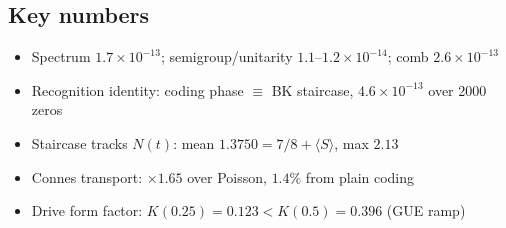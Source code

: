 \documentclass[11pt,a4paper]{article}
\begin{document}
\subsection{Key numbers}
\begin{tcolorbox}[colback=labblue!6, colframe=labblue!70!black, boxrule=0.6pt, title={Key results (canonical run)}]
\begin{itemize}[leftmargin=1.2em, itemsep=0.15em]
\item Spectrum $1.7\times10^{-13}$; semigroup/unitarity $1.1$--$1.2\times10^{-14}$; comb $2.6\times10^{-13}$
\item Recognition identity: coding phase $\equiv$ BK staircase, $4.6\times10^{-13}$ over 2000 zeros
\item Staircase tracks $N(t)$: mean $1.3750 = 7/8 + \langle S\rangle$, max $2.13$
\item Connes transport: $\times1.65$ over Poisson, $1.4\%$ from plain coding
\item Drive form factor: $K(0.25) = 0.123 < K(0.5) = 0.396$ (GUE ramp)
\end{itemize}
\end{tcolorbox}
\end{document}
